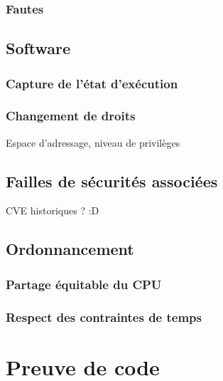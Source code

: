 			

			\subsubsection{Fautes}


		\subsection{Software}

			\subsubsection{Capture de l'état d'exécution}

			\subsubsection{Changement de droits}

				Espace d'adressage, niveau de privilèges

		\subsection{Failles de sécurités associées}
			CVE historiques ? :D


		\subsection{Ordonnancement}

			\subsubsection{Partage équitable du CPU}

			\subsubsection{Respect des contraintes de temps}

	\section{Preuve de code}

